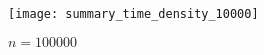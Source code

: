 \begin{figure}
  \centering
\texttt{[image: summary\_time\_density\_10000]}
        \caption{$n=100000$}
        \label{fig: summary-time-100000}
\end{figure}










%

